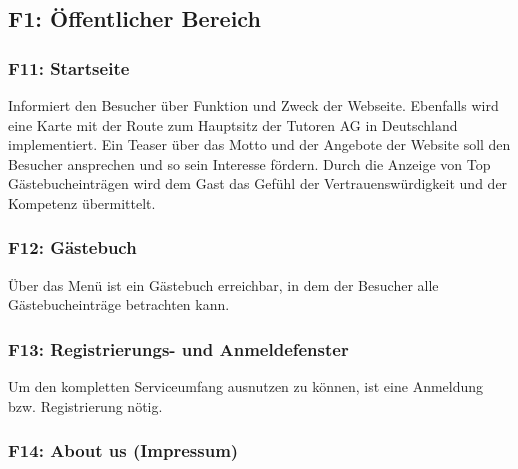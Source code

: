 \documentclass[10pt,a4paper]{scrartcl}
\begin{document}
\subsection{F1: Öffentlicher Bereich}
\subsubsection*{F11: Startseite}

Informiert den Besucher über Funktion und Zweck der Webseite. Ebenfalls wird eine Karte mit der Route zum Hauptsitz der Tutoren AG in Deutschland implementiert. Ein Teaser über das Motto und der Angebote der Website soll den Besucher ansprechen und so sein Interesse fördern. Durch die Anzeige von Top Gästebucheinträgen wird dem Gast das Gefühl der Vertrauenswürdigkeit und der Kompetenz übermittelt.

\subsubsection*{F12: Gästebuch}

Über das Menü ist ein Gästebuch erreichbar, in dem der Besucher alle Gästebucheinträge betrachten kann.


%

\subsubsection*{F13: Registrierungs- und Anmeldefenster}

Um den kompletten Serviceumfang ausnutzen zu können, ist eine Anmeldung bzw. Registrierung nötig.

\subsubsection*{F14: About us (Impressum)}
\end{document}
